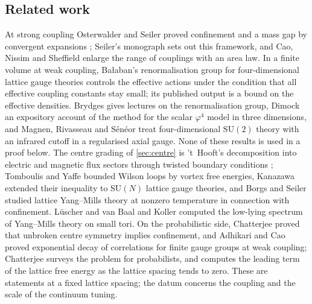 \documentclass[11pt,a4paper]{amsart}
\theoremstyle{definition}
\theoremstyle{remark}
\numberwithin{equation}{section}
\newcommand{\SU}{\mathrm{SU}}              %
\newcommand{\Mcirc}{\text{\upshape(M$^{\circ}$)}}   %
\begin{document}
\subsection{Related work}
At strong coupling Osterwalder and Seiler proved confinement and a mass gap by convergent expansions \cite{osterwalder1978}; Seiler's monograph \cite{seiler1982} sets out this framework, and Cao, Nissim and Sheffield \cite{cao2025expanded} enlarge the range of couplings with an area law. In a finite volume at weak coupling, Ba{\l}aban's renormalisation group for four-dimensional lattice gauge theories \cite{balaban1987,balaban1988a,balaban1988b,balaban1989a,balaban1989b} controls the effective actions under the condition that all effective coupling constants stay small; its published output is a bound on the effective densities. Brydges \cite{brydges2009} gives lectures on the renormalisation group, Dimock \cite{dimock2013} an expository account of the method for the scalar $\varphi^4$ model in three dimensions, and Magnen, Rivasseau and S\'en\'eor \cite{magnen1993} treat four-dimensional $\SU(2)$ theory with an infrared cutoff in a regularised axial gauge. None of these results is used in a proof below. The centre grading of \cref{sec:centre} is 't~Hooft's decomposition into electric and magnetic flux sectors through twisted boundary conditions \cite{thooft1979}; Tomboulis and Yaffe \cite{tomboulis1985} bounded Wilson loops by vortex free energies, Kanazawa \cite{kanazawa2009} extended their inequality to $\SU(N)$ lattice gauge theories, and Borgs and Seiler \cite{borgs1983} studied lattice Yang--Mills theory at nonzero temperature in connection with confinement. L\"uscher \cite{luscher1983} and van Baal and Koller \cite{koller1987} computed the low-lying spectrum of Yang--Mills theory on small tori. On the probabilistic side, Chatterjee \cite{chatterjee2021} proved that unbroken centre symmetry implies confinement, and Adhikari and Cao \cite{adhikari2025} proved exponential decay of correlations for finite gauge groups at weak coupling; Chatterjee \cite{chatterjee2019} surveys the problem for probabilists, and \cite{chatterjee2016} computes the leading term of the lattice free energy as the lattice spacing tends to zero. These are statements at a fixed lattice spacing; the datum \Mcirc{} concerns the coupling and the scale of the continuum tuning.
\end{document}
